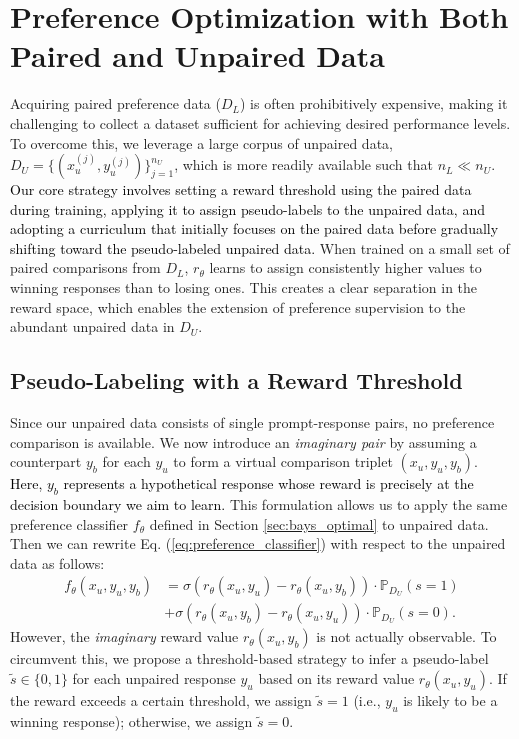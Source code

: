\documentclass{article} %
\newcommand\fix[1]{\textcolor{black}{#1}}
\begin{document}
\section{Preference Optimization with Both Paired and Unpaired Data}
\label{sec:both_labeled_and_unlabeled}

Acquiring paired preference data ($D_L$) is often prohibitively expensive, making it challenging to collect a dataset sufficient for achieving desired performance levels. To overcome this, we leverage a large corpus of unpaired data, $D_U = \{(x_u^{(j)}, y_u^{(j)})\}_{j=1}^{n_U}$, which is more readily available such that $n_L \ll n_U$. \fix{Our core strategy involves setting a reward threshold using the paired data during training, applying it to assign pseudo-labels to the unpaired data, and adopting a curriculum that initially focuses on the paired data before gradually shifting toward the pseudo-labeled unpaired data.} When trained on a small set of paired comparisons from $D_L$, $r_\theta$ learns to assign consistently higher values to winning responses than to losing ones. This creates a clear separation in the reward space, which enables the extension of preference supervision to the abundant unpaired data in $D_U$.


\subsection{Pseudo-Labeling with a Reward Threshold}
\label{sec:pseudo_labeling}
Since our unpaired data consists of single prompt-response pairs, no preference comparison is available. We now introduce an \textit{imaginary pair} by assuming a counterpart $y_b$ for each $y_u$ to form a virtual comparison triplet $(x_u, y_u, y_b)$. \fix{Here, $y_b$ represents a hypothetical response whose reward is precisely at the decision boundary we aim to learn.} This formulation allows us to apply the same preference classifier $f_\theta$ defined in Section \ref{sec:bays_optimal} to unpaired data. Then we can rewrite Eq. (\ref{eq:preference_classifier}) with respect to the unpaired data as follows:
\begin{align}
\label{eq:preference_classifier_unlabeled}
    f_\theta(x_u,y_u,y_b) &= \sigma(r_\theta(x_u,y_u)-r_\theta(x_u,y_b)) \cdot \mathbb{P}_{D_U}(s=1) \nonumber \\ &+ \sigma(r_\theta(x_u,y_b)-r_\theta(x_u,y_u)) \cdot \mathbb{P}_{D_U}(s=0).
\end{align}
However, the \textit{imaginary} reward value $r_\theta(x_u, y_b)$ is not actually observable. To circumvent this, we propose a threshold-based strategy to infer a pseudo-label $\tilde{s} \in \{0,1\}$ for each unpaired response $y_u$ based on its reward value $r_\theta(x_u, y_u)$. If the reward exceeds a certain threshold, we assign $\tilde{s} = 1$ (i.e., $y_u$ is likely to be a winning response); otherwise, we assign $\tilde{s} = 0$.
\end{document}
